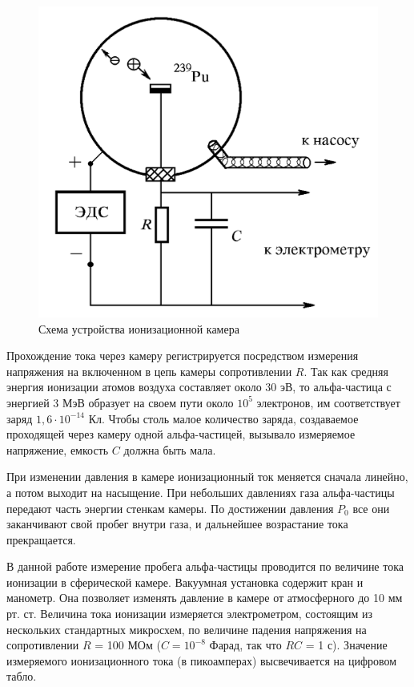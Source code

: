 \documentclass[a4paper, 12pt]{article}
\begin{document}
	\begin{figure}
		\includegraphics[width=\linewidth]{Ion}
		\caption{Схема устройства ионизационной камера}
		\label{ris Ion}
	\end{figure}
	
	Прохождение тока через камеру регистрируется посредством измерения напряжения на включенном в цепь камеры сопротивлении $ R $.
	Так как средняя энергия ионизации атомов воздуха составляет около 30 эВ, то альфа-частица с энергией 3 МэВ образует на своем пути около $ 10^5 $ электронов, им соответствует заряд $1,6 \cdot 10^{-14} $ Кл. Чтобы
	столь малое количество заряда, создаваемое проходящей через камеру одной альфа-частицей, вызывало измеряемое напряжение, емкость $ C $
	должна быть мала.
	
	При изменении давления в камере ионизационный ток меняется сначала линейно, а потом выходит на насыщение. При небольших давлениях газа
	альфа-частицы передают часть энергии стенкам камеры. По достижении
	давления $ P_0 $ все они заканчивают свой пробег внутри газа, и дальнейшее возрастание тока прекращается.
	
	В данной работе измерение пробега альфа-частицы проводится по величине тока ионизации в сферической камере. Вакуумная установка содержит кран и манометр. Она позволяет изменять давление в камере от атмосферного до 10 мм рт. ст.
	Величина тока ионизации измеряется электрометром, состоящим из
	нескольких стандартных микросхем, по величине падения напряжения
	на сопротивлении $ R $ = 100 МОм ($ C = 10^{-8} $ Фарад, так что $ RC $ = 1 с).
	Значение измеряемого ионизационного тока (в пикоамперах) высвечивается на цифровом табло.
	
\end{document}
